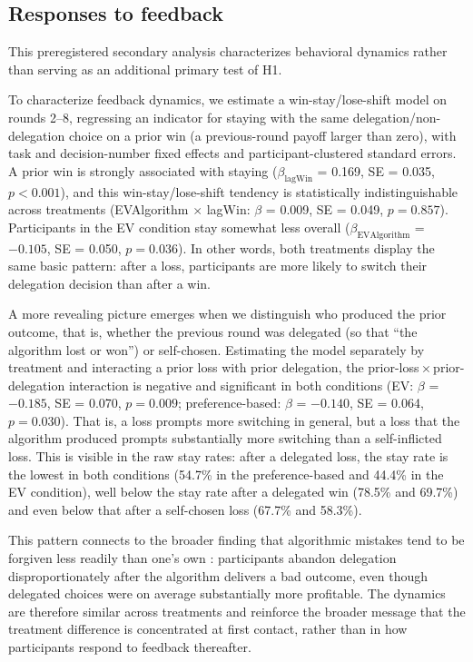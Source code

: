 \documentclass[a4paper, 12pt, fleqn]{article}
\theoremstyle{definition}
\begin{document}
\subsection{Responses to feedback}
This preregistered secondary analysis characterizes behavioral dynamics rather than serving as an additional primary test of H1.

To characterize feedback dynamics, we estimate a win-stay/lose-shift model on rounds 2--8, regressing an indicator for staying with the same delegation/non-delegation choice on a prior win (a previous-round payoff larger than zero), with task and decision-number fixed effects and participant-clustered standard errors. A prior win is strongly associated with staying ($\beta_{\text{lagWin}}$ = 0.169, SE = 0.035, $p < 0.001$), and this win-stay/lose-shift tendency is statistically indistinguishable across treatments (EVAlgorithm $\times$ lagWin: $\beta$ = 0.009, SE = 0.049, $p = 0.857$). Participants in the EV condition stay somewhat less overall ($\beta_{\text{EVAlgorithm}}$ = $-0.105$, SE = 0.050, $p = 0.036$). In other words, both treatments display the same basic pattern: after a loss, participants are more likely to switch their delegation decision than after a win.

A more revealing picture emerges when we distinguish who produced the prior outcome, that is, whether the previous round was delegated (so that ``the algorithm lost or won'') or self-chosen. Estimating the model separately by treatment and interacting a prior loss with prior delegation, the prior-loss\,$\times$\,prior-delegation interaction is negative and significant in both conditions (EV: $\beta$ = $-0.185$, SE = 0.070, $p = 0.009$; preference-based: $\beta$ = $-0.140$, SE = 0.064, $p = 0.030$). That is, a loss prompts more switching in general, but a loss that the algorithm produced prompts substantially more switching than a self-inflicted loss. This is visible in the raw stay rates: after a delegated loss, the stay rate is the lowest in both conditions (54.7\% in the preference-based and 44.4\% in the EV condition), well below the stay rate after a delegated win (78.5\% and 69.7\%) and even below that after a self-chosen loss (67.7\% and 58.3\%). 

This pattern connects to the broader finding that algorithmic mistakes tend to be forgiven less readily than one's own \citep{Dietvorst2018,Renier2021}: participants abandon delegation disproportionately after the algorithm delivers a bad outcome, even though delegated choices were on average substantially more profitable. The dynamics are therefore similar across treatments and reinforce the broader message that the treatment difference is concentrated at first contact, rather than in how participants respond to feedback thereafter.
\end{document}
